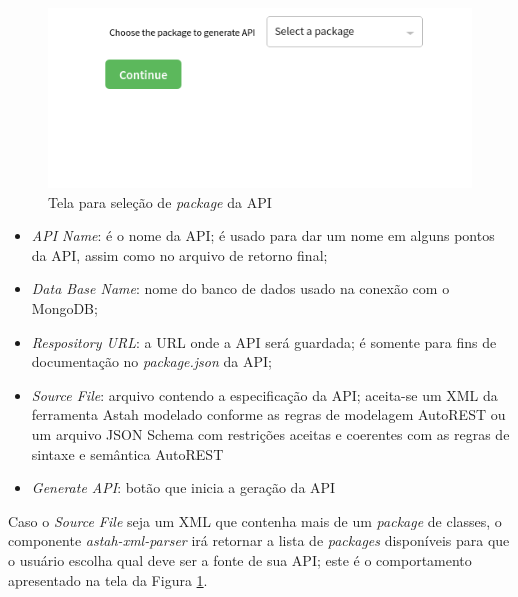 \begin{figure}
    \begin{center}
        \includegraphics[scale=0.7]{imagens/Mockup_pack_select.png}
    \end{center}
	\caption{\label{fig:mpacks}Tela para seleção de \textit{package} da API}
\end{figure}

\begin{itemize}
    \item \textit{API Name}: é o nome da API; é usado para dar um nome em alguns pontos da API, assim como no arquivo de retorno final;
    \item \textit{Data Base Name}: nome do banco de dados usado na conexão com o MongoDB;
    \item \textit{Respository URL}: a URL onde a API será guardada; é somente para fins de documentação no \textit{package.json} da API;
    \item \textit{Source File}: arquivo contendo a especificação da API; aceita-se um XML da ferramenta Astah modelado conforme as regras de modelagem AutoREST ou um arquivo JSON Schema com restrições aceitas e coerentes com as regras de sintaxe e semântica AutoREST
    \item \textit{Generate API}: botão que inicia a geração da API
\end{itemize}

Caso o \textit{Source File} seja um XML que contenha mais de um \textit{package} de classes, o componente \textit{astah-xml-parser} irá retornar a lista de \textit{packages} disponíveis para que o usuário escolha qual deve ser a fonte de sua API; este é o comportamento apresentado na tela da Figura \ref{fig:mpacks}.

